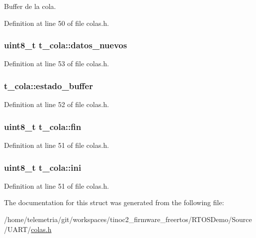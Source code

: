Buffer de la cola. 



Definition at line 50 of file colas.\+h.

\subsubsection[{\texorpdfstring{datos\+\_\+nuevos}{datos_nuevos}}]{\setlength{\rightskip}{0pt plus 5cm}uint8\+\_\+t t\+\_\+cola\+::datos\+\_\+nuevos}\hypertarget{structt__cola_ab28a0c32685544a21076d390d2d9f800}{}\label{structt__cola_ab28a0c32685544a21076d390d2d9f800}


Definition at line 53 of file colas.\+h.

\subsubsection[{\texorpdfstring{estado\+\_\+buffer}{estado_buffer}}]{ t\+\_\+cola\+::estado\+\_\+buffer}\hypertarget{structt__cola_ad0292a1aa7a79b98d63083ed0d732df6}{}\label{structt__cola_ad0292a1aa7a79b98d63083ed0d732df6}


Definition at line 52 of file colas.\+h.

\subsubsection[{\texorpdfstring{fin}{fin}}]{\setlength{\rightskip}{0pt plus 5cm}uint8\+\_\+t t\+\_\+cola\+::fin}\hypertarget{structt__cola_a7a826546e1b03d5efc5ce211cc867008}{}\label{structt__cola_a7a826546e1b03d5efc5ce211cc867008}


Definition at line 51 of file colas.\+h.

\subsubsection[{\texorpdfstring{ini}{ini}}]{\setlength{\rightskip}{0pt plus 5cm}uint8\+\_\+t t\+\_\+cola\+::ini}\hypertarget{structt__cola_ad3a0ddb896e8181a52ca74637016f1c7}{}\label{structt__cola_ad3a0ddb896e8181a52ca74637016f1c7}


Definition at line 51 of file colas.\+h.



The documentation for this struct was generated from the following file\+:\begin{DoxyCompactItemize}
\item 
/home/telemetria/git/workspaces/tinoc2\+\_\+firmware\+\_\+freertos/\+R\+T\+O\+S\+Demo/\+Source/\+U\+A\+R\+T/\hyperlink{colas_8h}{colas.\+h}\end{DoxyCompactItemize}
